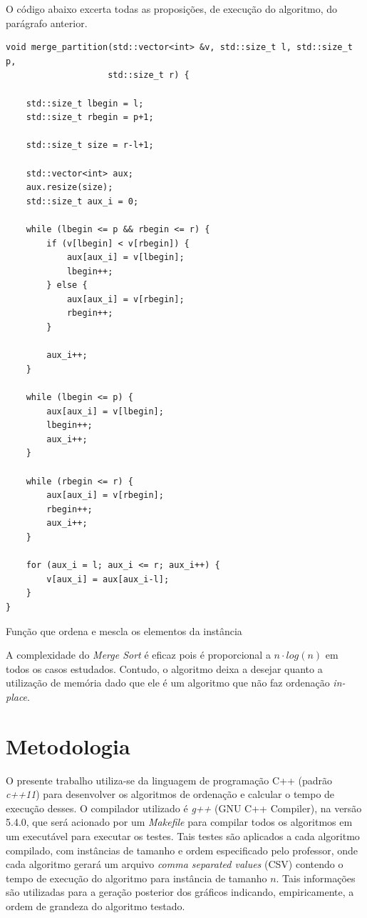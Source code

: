 \documentclass[a4paper, 12pt]{report}
\begin{document}
O código abaixo excerta todas as proposições, de execução do algoritmo, do
parágrafo anterior.

\begin{listing}[H]
\begin{verbatim}
void merge_partition(std::vector<int> &v, std::size_t l, std::size_t p,
                    std::size_t r) {

    std::size_t lbegin = l;
    std::size_t rbegin = p+1;

    std::size_t size = r-l+1;

    std::vector<int> aux;
    aux.resize(size);
    std::size_t aux_i = 0;

    while (lbegin <= p && rbegin <= r) {
        if (v[lbegin] < v[rbegin]) {
            aux[aux_i] = v[lbegin];
            lbegin++;
        } else {
            aux[aux_i] = v[rbegin];
            rbegin++;
        }

        aux_i++;
    }

    while (lbegin <= p) {
        aux[aux_i] = v[lbegin];
        lbegin++;
        aux_i++;
    }

    while (rbegin <= r) {
        aux[aux_i] = v[rbegin];
        rbegin++;
        aux_i++;
    }

    for (aux_i = l; aux_i <= r; aux_i++) {
        v[aux_i] = aux[aux_i-l];
    }
}
\end{verbatim}
\caption{Função que ordena e mescla os elementos da instância}
\end{listing}

A complexidade do \emph{Merge Sort} é eficaz pois é proporcional a
$n \cdot log{}(n)$ em todos os casos estudados. Contudo, o algoritmo deixa a
desejar quanto a utilização de memória dado que ele é um algoritmo que não
faz ordenação \emph{in-place}.

\part{Metodologia}
\label{sec-3}
O presente trabalho utiliza-se da linguagem de programação C++ (padrão \emph{c++11})
para desenvolver os algoritmos de ordenação e calcular o tempo de execução
desses. O compilador utilizado é \emph{g++} (GNU C++ Compiler), na versão 5.4.0, que
será acionado por um \emph{Makefile} para compilar todos os algoritmos em um
executável para executar os testes. Tais testes são aplicados a cada algoritmo
compilado, com instâncias de tamanho e ordem especificado pelo professor, onde
cada algoritmo gerará um arquivo \emph{comma separated values} (CSV) contendo o
tempo de execução do algoritmo para instância de tamanho $n$. Tais informações
são utilizadas para a geração posterior dos gráficos indicando, empiricamente,
a ordem de grandeza do algoritmo testado.
\end{document}
